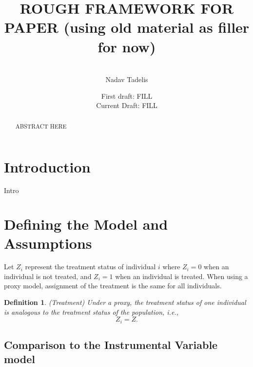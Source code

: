 \documentclass[12pt]{article}
\newtheorem{definition}{Definition}
\begin{document}
\title{ROUGH FRAMEWORK FOR PAPER (using old material as filler for now)}

\date{First draft: FILL\\ Current Draft: FILL}

\author{ \\ Nadav Tadelis}


\maketitle

\hskip 80pt 


\begin{abstract}
\footnotesize{
\noindent ABSTRACT HERE \vfill}
\end{abstract}

\clearpage



\section{Introduction}
\label{sec_intro}
Intro


\section{Defining the Model and Assumptions}
\label{sec_background}

Let $Z_i$ represent the treatment status of individual $i$ where $Z_i=0$ when an individual is not treated, and $Z_i=1$ when an individual is treated. When using a proxy model, assignment of the treatment is the same for all individuals.
\begin{definition} \label{D1} (Treatment) Under a proxy, the treatment status of one individual is analogous to the treatment status of the population, i.e.,
\begin{equation*}
Z_i=Z. 
\end{equation*}
\end{definition}

\subsection{Comparison to the Instrumental Variable model}
\label{sec_background_iv}
\end{document}
